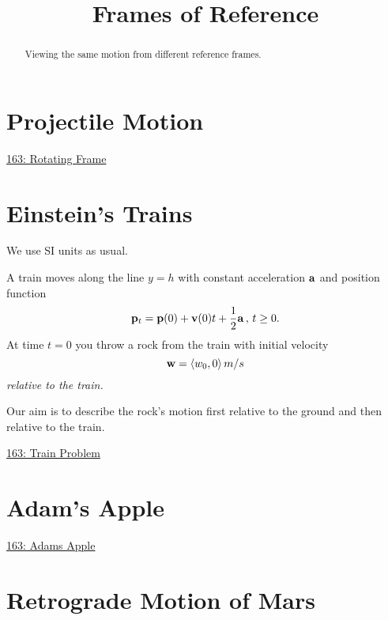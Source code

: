 \documentclass{ximera}
\title{Frames of Reference}
\begin{document}
\begin{abstract}
Viewing the same motion from different reference frames.
\end{abstract}
\maketitle


\section{Projectile Motion}
\begin{question}  \label{Qdsf435r45te}

\begin{onlineOnly}
    \begin{center}
\end{center}
\end{onlineOnly}

\href{https://www.desmos.com/3d/sqvm9cvfyd}{163: Rotating Frame}


\end{question}


\section{Einstein's Trains}
\begin{question}  \label{Qsdfds44445te}
We use SI units as usual.

A train moves along the line $y=h$ with constant acceleration ${\bf a}$ and position function
\[
 {\bf p}_t = {\bf p}(0) + {\bf v}(0)t + \frac{1}{2} {\bf a} \, , \, t\geq 0 .
\]
At time $t=0$ you throw a rock from the train with initial velocity
\[
         {\bf w} = \langle w_0, 0 \rangle \, m/s
\]
\emph{relative to the train.}

Our aim is to describe the rock's motion first relative to the ground and then relative to the train.

\begin{onlineOnly}
    \begin{center}
\end{center}
\end{onlineOnly}

\href{https://www.desmos.com/calculator/uzywalzuny}{163: Train Problem}


\end{question}

\section{Adam's Apple}

\begin{onlineOnly}
    \begin{center}
\end{center}
\end{onlineOnly}

\href{https://www.desmos.com/calculator/xvfucsguj9}{163: Adams Apple}



\section{Retrograde Motion of Mars}
\end{document}
